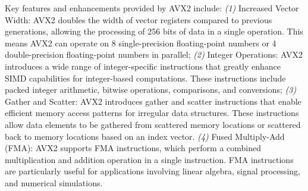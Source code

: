 Key features and enhancements provided by AVX2 include:
\emph{(1)} Increased Vector Width: AVX2 doubles the width of vector registers
compared to previous generations, allowing the processing of 256 bits of data
in a single operation. This means AVX2 can operate on 8 single-precision
floating-point numbers or 4 double-precision floating-point numbers in
parallel;
\emph{(2)} Integer Operations: AVX2 introduces a wide range of integer-specific
instructions that greatly enhance SIMD capabilities for integer-based
computations. These instructions include packed integer arithmetic, bitwise
operations, comparisons, and conversions;
\emph{(3)} Gather and Scatter: AVX2 introduces gather and scatter instructions
that enable efficient memory access patterns for irregular data structures.
These instructions allow data elements to be gathered from scattered memory
locations or scattered back to memory locations based on an index vector.
\emph{(4)} Fused Multiply-Add (FMA): AVX2 supports FMA instructions, which
perform a combined multiplication and addition operation in a single
instruction. FMA instructions are particularly useful for applications
involving linear algebra, signal processing, and numerical simulations.
